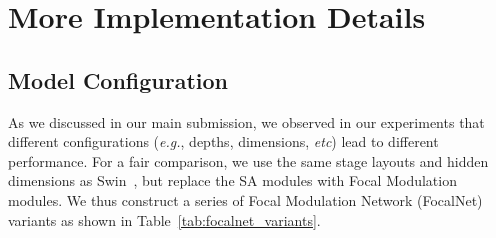 \documentclass{article}
\begin{document}
{\small


}






























\newpage
\appendix
\section{More Implementation Details}

\subsection{Model Configuration}

As we discussed in our main submission, we observed in our experiments that different configurations (\textit{e.g.}, depths, dimensions, \textit{etc}) lead to different performance. For a fair comparison, we use the same stage layouts and hidden dimensions as Swin~\cite{liu2021swin,yang2021focal}, but replace the SA modules with Focal Modulation modules. We thus construct a series of Focal Modulation Network (FocalNet) variants as shown in Table~\ref{tab:focalnet_variants}.
\end{document}

